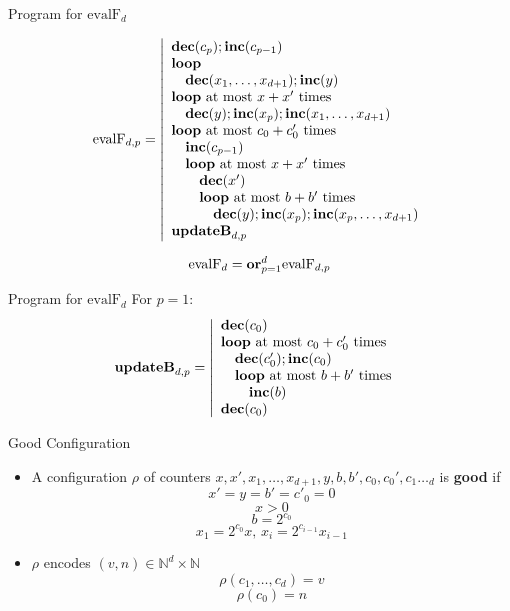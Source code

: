 \documentclass{beamer}
\renewcommand{\r}[1]{\text{\rmfamily{\textbf{#1}}}}
\newcommand{\inc}[0]{\text{\rmfamily{\textbf{inc}}}}
\newcommand{\dec}[0]{\text{\rmfamily{\textbf{dec}}}}
\newcommand{\lo}[0]{\text{\rmfamily{\textbf{loop}}}}
\newcommand{\loopam}[2]{\text{\rmfamily{\textbf{loop} at most $#1$ times $#2$}}}
\newcommand{\Or}[0]{\text{\rmfamily{\textbf{or}}}}
\begin{document}
\begin{frame}{Program for $\text{evalF}_d$}

       $$\text{evalF}_{d,p} = \left\vert \begin{array}{l}
            \dec(c_p);\inc(c_{p-1})  \\
            \lo \\
            \quad \dec(x_1,\dots,x_{d+1}); \inc(y) \\
            \loopam{x+x'}{} \\
            \quad \dec(y);\inc(x_p );\inc(x_1 ,\dots , x_{d+1} ) \\
            \loopam{c_0+c_0'}{} \\
            \quad \inc(c_{p-1}) \\
            \quad \loopam{x+x'}{} \\
            \quad \quad \dec(x') \\
            \quad \quad \loopam{b+b'}{} \\
            \quad \quad \quad \dec(y);\inc(x_p);\inc(x_p ,\dots , x_{d+1} ) \\
            \r{updateB}_{d,p} \\
            
    \end{array} \right.$$

    $$\text{evalF}_d = \Or_{p=1}^{d} \text{evalF}_{d,p}$$
\end{frame}



\begin{frame}{Program for $\text{evalF}_d$}
    For $p = 1$:
       $$\r{updateB}_{d,p} = \left\vert \begin{array}{l}
            \dec(c_0) \\
            \loopam{c_0+c_0'}{} \\
            \quad \dec(c_0');\inc(c_0) \\
            \quad \loopam{b+b'}{}\\
            \quad \quad \inc(b) \\
            \dec(c_0) 
    \end{array} \right.$$
\end{frame}

\begin{frame}{Good Configuration}
\begin{itemize}
    \item A configuration $\rho$ of counters $x,x',x_1,\dots,x_{d+1},y,b,b',c_0,c_0',c_1\dotsc_{d}$ is \textbf{good} if 
    $$x' = y = b' = c'_0 = 0$$
    $$x > 0$$
    $$b = 2^{c_0}$$
    $$x_1 = 2^{c_0}x,\, x_i = 2^{c_{i-1}}x_{i-1}$$
    \item $\rho$ encodes $(v,n) \in \mathbb{N}^d\times\mathbb{N}$
    $$\rho(c_1,\dots,c_d) = v$$
    $$\rho(c_0) = n$$
\end{itemize}
    
    
\end{frame}
\end{document}
